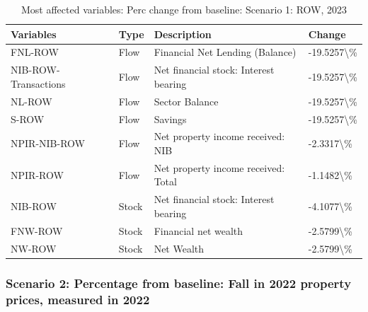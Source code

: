 \documentclass[
]{book}
\begin{document}
\begin{table}

\caption{\label{tab:most-affected-scenario-1-perc-2023-ROW}Most affected variables: Perc change from baseline: Scenario 1: ROW, 2023}
\centering
\fontsize{10}{12}\selectfont
\begin{tabular}[t]{l|l|l|l}
\hline
Variables & Type & Description & Change\\
\hline
FNL-ROW & Flow & Financial Net Lending (Balance) & -19.5257\textbackslash{}\%\\
\hline
NIB-ROW-Transactions & Flow & Net financial stock: Interest bearing & -19.5257\textbackslash{}\%\\
\hline
NL-ROW & Flow & Sector Balance & -19.5257\textbackslash{}\%\\
\hline
S-ROW & Flow & Savings & -19.5257\textbackslash{}\%\\
\hline
NPIR-NIB-ROW & Flow & Net property income received: NIB & -2.3317\textbackslash{}\%\\
\hline
NPIR-ROW & Flow & Net property income received: Total & -1.1482\textbackslash{}\%\\
\hline
NIB-ROW & Stock & Net financial stock: Interest bearing & -4.1077\textbackslash{}\%\\
\hline
FNW-ROW & Stock & Financial net wealth & -2.5799\textbackslash{}\%\\
\hline
NW-ROW & Stock & Net Wealth & -2.5799\textbackslash{}\%\\
\hline
\end{tabular}
\end{table}

\hypertarget{scenario-2-percentage-from-baseline-fall-in-2022-property-prices-measured-in-2022}{%
\subsubsection{Scenario 2: Percentage from baseline: Fall in 2022 property prices, measured in 2022}\label{scenario-2-percentage-from-baseline-fall-in-2022-property-prices-measured-in-2022}}
\end{document}
